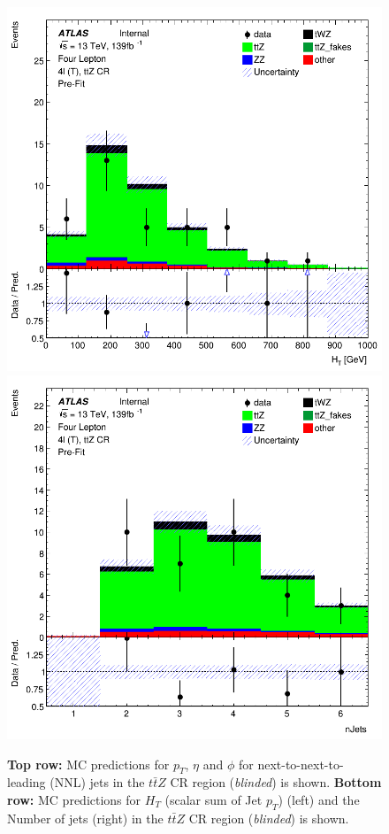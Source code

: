 \begin{figure}[htbp]
    \includegraphics[width=.3\textwidth]{figures/PreFitPlots/lep4_ttZ_4T_HT.png}   \quad
    \includegraphics[width=.3\textwidth]{figures/PreFitPlots/lep4_ttZ_4T_Num_Jets.png}

    \caption{\textbf{Top row:} MC predictions for $p_{T}$, $\eta$ and $\phi$ for next-to-next-to-leading (NNL) jets in the $t\bar{t}Z$ CR region (\textit{blinded}) is shown. \textbf{Bottom row:} MC predictions for $H_{T}$ (scalar sum of Jet $p_{T}$) (left) and the Number of jets (right) in the $t\bar{t}Z$ CR region (\textit{blinded}) is shown.}
    \label{fig:4lep-ttZ-CR-NNLjetPlots} 
\end{figure}



